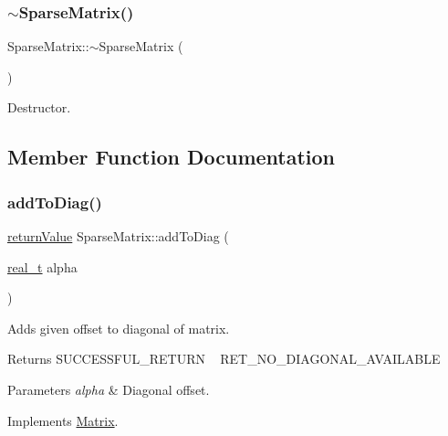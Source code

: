 \subsubsection{\texorpdfstring{$\sim$\+Sparse\+Matrix()}{~SparseMatrix()}}
{\footnotesize\ttfamily Sparse\+Matrix\+::$\sim$\+Sparse\+Matrix (\begin{DoxyParamCaption}{ }\end{DoxyParamCaption})\hspace{0.3cm}{\ttfamily [virtual]}}

Destructor. 

\subsection{Member Function Documentation}
\mbox{\label{class_sparse_matrix_a11500e9368167d4c0643fe0cebf2ccd6}} 
\subsubsection{\texorpdfstring{add\+To\+Diag()}{addToDiag()}}
{\footnotesize\ttfamily \hyperlink{_message_handling_8hpp_a81d556f613bfbabd0b1f9488c0fa865e}{return\+Value} Sparse\+Matrix\+::add\+To\+Diag (\begin{DoxyParamCaption}\item[{\hyperlink{qp_o_a_s_e_s__wrapper_8h_a0d00e2b3dfadee81331bbb39068570c4}{real\+\_\+t}}]{alpha }\end{DoxyParamCaption})\hspace{0.3cm}{\ttfamily [virtual]}}

Adds given offset to diagonal of matrix. \begin{DoxyReturn}{Returns}
S\+U\+C\+C\+E\+S\+S\+F\+U\+L\+\_\+\+R\+E\+T\+U\+RN ~\newline
 R\+E\+T\+\_\+\+N\+O\+\_\+\+D\+I\+A\+G\+O\+N\+A\+L\+\_\+\+A\+V\+A\+I\+L\+A\+B\+LE 
\end{DoxyReturn}

\begin{DoxyParams}{Parameters}
{\em alpha} & Diagonal offset. \\
\hline
\end{DoxyParams}


Implements \hyperlink{class_matrix_a7ee8d1b4ef0d5d5fb34342ea1889382f}{Matrix}.

\mbox{\label{class_sparse_matrix_ac81c1ddda42b186de118b6eab49a1852}} 
